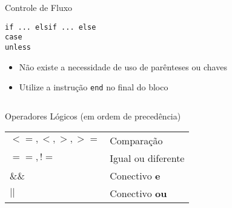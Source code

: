 \begin{frame}{Controle de Fluxo}
  \begin{center}
    \Large \verb!if ... elsif ... else! \\ \verb!case! \\ \verb!unless!
  \end{center}   
\framebreak
  \begin{itemize}
    \item \alert{Não} existe a necessidade de uso de \alert{parênteses} ou \alert{chaves}
    \item \alert{Utilize} a instrução \verb!end! no final do bloco
  \end{itemize}   
  \begin{columns}
    \begin{column}{0.5\textwidth}
    		  
    \end{column}
    \begin{column}{0.5\textwidth}
    		  
    \end{column}
  \end{columns}
\framebreak
    		  
\framebreak
    		  
\end{frame}
\begin{frame}[fragile,t]{Operadores Lógicos (em ordem de precedência)}
	\begin{table}[tp] 	
		\setlength{\tabcolsep}{8pt}
    \setlength{\extrarowheight}{2pt}    
		\begin{tabular}{p{2.5cm}l}
    	\toprule
      $<=, <, >, >=$ &  Comparação\\
      $==, !=$ & Igual ou diferente  \\
      $\&\&$ &  Conectivo \textbf{e} \\
      $||$ & Conectivo \textbf{ou} \\
	    \bottomrule
		\end{tabular}
	\end{table}   
\end{frame}
